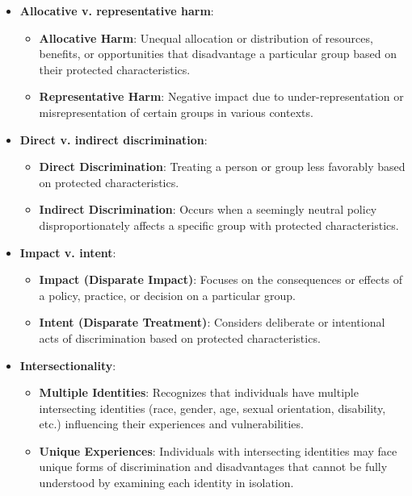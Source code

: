 \begin{itemize}
    \item \textbf{Allocative v. representative harm}:
    \begin{itemize}
        \item \textbf{Allocative Harm}: Unequal allocation or distribution of resources, benefits, or opportunities that disadvantage a particular group based on their protected characteristics.
        \item \textbf{Representative Harm}: Negative impact due to under-representation or misrepresentation of certain groups in various contexts.
    \end{itemize}
    
    \item \textbf{Direct v. indirect discrimination}:
    \begin{itemize}
        \item \textbf{Direct Discrimination}: Treating a person or group less favorably based on protected characteristics.
        \item \textbf{Indirect Discrimination}: Occurs when a seemingly neutral policy disproportionately affects a specific group with protected characteristics.
    \end{itemize}
    
    \item \textbf{Impact v. intent}:
    \begin{itemize}
        \item \textbf{Impact (Disparate Impact)}: Focuses on the consequences or effects of a policy, practice, or decision on a particular group.
        \item \textbf{Intent (Disparate Treatment)}: Considers deliberate or intentional acts of discrimination based on protected characteristics.
    \end{itemize}
    
    \item \textbf{Intersectionality}:
    \begin{itemize}
        \item \textbf{Multiple Identities}: Recognizes that individuals have multiple intersecting identities (race, gender, age, sexual orientation, disability, etc.) influencing their experiences and vulnerabilities.
        \item \textbf{Unique Experiences}: Individuals with intersecting identities may face unique forms of discrimination and disadvantages that cannot be fully understood by examining each identity in isolation.
    \end{itemize}
\end{itemize}


